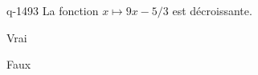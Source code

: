 \begin{truefalse}{q-1493}
La fonction $x\mapsto 9x-5/3$ est décroissante.
\item Vrai
\item* Faux
\end{truefalse}

